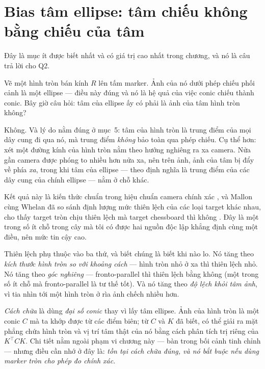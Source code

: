 \documentclass[../../marker.tex]{subfiles}
\begin{document}
\section{Bias tâm ellipse: tâm chiếu không bằng chiếu của tâm}

Đây là mục ít được biết nhất và có giá trị cao nhất trong chương, và nó là câu trả lời cho Q2.

Vẽ một hình tròn bán kính \(R\) lên tấm marker. Ảnh của nó dưới phép chiếu phối cảnh là một ellipse --- điều này đúng và nó là hệ quả của việc conic chiếu thành conic. Bây giờ câu hỏi: tâm của ellipse ấy có phải là ảnh của tâm hình tròn không?

Không. Và lý do nằm đúng ở mục~5: tâm của hình tròn là trung điểm của mọi dây cung đi qua nó, mà trung điểm \emph{không} bảo toàn qua phép chiếu. Cụ thể hơn: xét một đường kính của hình tròn nằm theo hướng nghiêng ra xa camera. Nửa gần camera được phóng to nhiều hơn nửa xa, nên trên ảnh, ảnh của tâm bị đẩy về phía \emph{xa}, trong khi tâm của ellipse --- theo định nghĩa là trung điểm của các dây cung của chính ellipse --- nằm ở chỗ khác.

Kết quả này là kiến thức chuẩn trong hiệu chuẩn camera chính xác \cite{heikkila2000geometric}, và Mallon cùng Whelan đã so sánh định lượng mức thiên lệch của các loại target khác nhau, cho thấy target tròn chịu thiên lệch mà target chessboard thì không \cite{mallon2007bias}. Đây là một trong số ít chỗ trong cây mà tôi có được hai nguồn độc lập khẳng định cùng một điều, nên mức tin cậy cao.

Thiên lệch phụ thuộc vào ba thứ, và biết chúng là biết khi nào lo. Nó tăng theo \emph{kích thước hình tròn so với khoảng cách} --- hình tròn nhỏ ở xa thì thiên lệch nhỏ. Nó tăng theo \emph{góc nghiêng} --- fronto-parallel thì thiên lệch bằng không (một trong số ít chỗ mà fronto-parallel là tư thế tốt). Và nó tăng theo \emph{độ lệch khỏi tâm ảnh}, vì tia nhìn tới một hình tròn ở rìa ảnh chếch nhiều hơn.

\emph{Cách chữa} là dùng \emph{đại số conic} thay vì lấy tâm ellipse. Ảnh của hình tròn là một conic \(C\) mà ta khớp được từ các điểm biên; từ \(C\) và \(K\) đã biết, có thể giải ra mặt phẳng chứa hình tròn và vị trí tâm thật của nó bằng cách phân tích trị riêng của \(K^\top C K\). Chi tiết nằm ngoài phạm vi chương này ---  bàn trong bối cảnh tinh chỉnh --- nhưng điều cần nhớ ở đây là: \emph{tồn tại cách chữa đúng, và nó bắt buộc nếu dùng marker tròn cho phép đo chính xác}.
\end{document}
